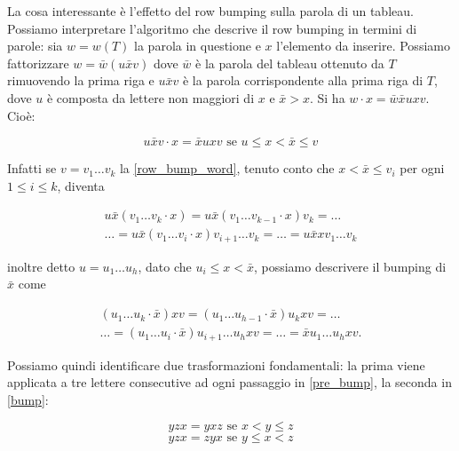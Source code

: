 La cosa interessante \`e l'effetto del row bumping sulla
parola di un tableau. 
Possiamo interpretare l'algoritmo che descrive
il row bumping in termini di parole: sia $w = w(T)$ la parola in questione e
$x$ l'elemento da inserire. Possiamo fattorizzare $w=\bar w (u \bar x
v)$ dove $\bar w$ \`e la parola del tableau ottenuto da $T$ rimuovendo
la prima riga e $u \bar x v$ \`e la parola corrispondente
alla prima riga di $T$, dove $u$ \`e composta da lettere non maggiori
di $x$ e $\bar x > x$. Si ha $w \cdot x = \bar w \bar x u x
v$. Cio\`e:

\begin{equation}\label{row_bump_word}
u \bar x v \cdot x = \bar x u
  x v \mbox{ se } u \leq x < \bar x \leq v
\end{equation}

Infatti se $v=v_1 \ldots v_k$ la \eqref{row_bump_word}, tenuto conto che
$x < \bar x \leq v_i$ per ogni $1 \leq i \leq k$, diventa

\begin{equation}\label{pre_bump}
\begin{split}
u \bar x (v_1 \ldots v_k \cdot x)
= u \bar x (v_1 \ldots v_{k-1}
\cdot x )v_k = \ldots\\
\ldots = u \bar x (v_1 \ldots
v_i \cdot x )v_{i+1} \ldots v_k = \ldots
= u \bar x x v_1 \ldots v_k
\end{split}
\end{equation}

inoltre detto $u=u_1 \ldots u_h$, dato che $u_i \leq x < \bar x$, possiamo
descrivere il bumping di $\bar x$ come

\begin{equation}\label{bump}
\begin{split}
(u_1 \ldots u_k \cdot \bar x) x v
= (u_1 \ldots u_{h-1} \cdot \bar x) u_k x v = \ldots\\
\ldots =  (u_1 \ldots u_i \cdot \bar x
)u_{i+1} \ldots u_h x v = \ldots
= \bar x u_1 \ldots u_h x v.
\end{split}
\end{equation}

Possiamo quindi identificare due trasformazioni fondamentali: la prima
viene applicata a tre lettere consecutive ad ogni passaggio in \eqref{pre_bump}, la seconda
in \eqref{bump}:

\begin{equation}\label{k1}\tag{$K_1$}
y z x = y x z \mbox{ se } x < y
\leq z
\end{equation}
\begin{equation}\label{k2}\tag{$K_2$}
y z x = z y x \mbox{ se } y
\leq x < z
\end{equation}

